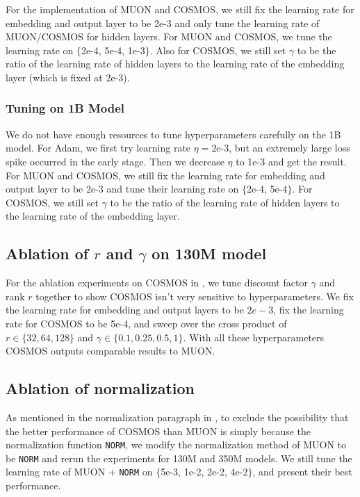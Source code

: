 For the implementation of MUON and COSMOS, we still fix the learning rate for embedding and output layer to be 2e-3 and only tune the learning rate of MUON/COSMOS for hidden layers. For MUON and COSMOS, we tune the learning rate on $\{$2e-4, 5e-4, 1e-3$\}$. Also for COSMOS, we still set $\gamma$ to be the ratio of the learning rate of hidden layers to the learning rate of the embedding layer (which is fixed at 2e-3).

\subsubsection{Tuning on 1B Model}\label{sec:config-1b}
We do not have enough resources to tune hyperparameters carefully on the 1B model. For Adam, we first try learning rate $\eta=\text{2e-3}$, but an extremely large loss spike occurred in the early stage. Then we decrease $\eta$ to 1e-3 and get the result. For MUON and COSMOS, we still fix the learning rate for embedding and output layer to be 2e-3 and tune their learning rate on $\{$2e-4, 5e-4$\}$. For COSMOS, we still set $\gamma$ to be the ratio of the learning rate of hidden layers to the learning rate of the embedding layer.

\subsection{Ablation of $r$ and $\gamma$ on 130M model}
For the ablation experiments on COSMOS in , we tune discount factor $\gamma$ and rank $r$ together to show COSMOS isn't very sensitive to hyperparameters. We fix the learning rate for embedding and output layers to be $2e-3$, fix the learning rate for COSMOS to be 5e-4, and sweep over the cross product of $r \in \{32, 64, 128\}$ and $\gamma \in \{0.1, 0.25, 0.5, 1\}$. With all these hyperparameters COSMOS outputs comparable results to MUON.

\subsection{Ablation of normalization}
As mentioned in the normalization paragraph in , to exclude the possibility that the better performance of COSMOS than MUON is simply because the normalization function \texttt{NORM}, we modify the normalization method of MUON to be \texttt{NORM} and rerun the experiments for 130M and 350M models. We still tune the learning rate of MUON $+$ \texttt{NORM} on $\{$5e-3, 1e-2, 2e-2, 4e-2$\}$, and present their best performance.

